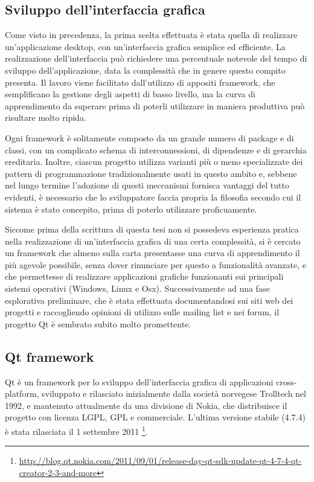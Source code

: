 \subsection{Sviluppo dell'interfaccia grafica}

Come visto in precedenza, la prima scelta effettuata è stata quella di realizzare un'applicazione desktop, con un'interfaccia grafica semplice ed efficiente. La realizzazione dell'interfaccia può richiedere una percentuale notevole del tempo di sviluppo dell'applicazione, data la complessità che in genere questo compito presenta. Il lavoro viene facilitato dall'utilizzo di appositi framework, che semplificano la gestione degli aspetti di basso livello, ma la curva di apprendimento da superare prima di poterli utilizzare in maniera produttiva può risultare molto ripida. 

Ogni framework è solitamente composto da un grande numero di package e di classi, con un complicato schema di interconnessioni, di dipendenze e di gerarchia ereditaria. Inoltre, ciascun progetto utilizza varianti più o meno specializzate dei pattern di programmazione tradizionalmente usati in questo ambito e, sebbene nel lungo termine l'adozione di questi meccanismi fornisca vantaggi del tutto evidenti, è necessario che lo sviluppatore faccia propria la filosofia secondo cui il sistema è stato concepito, prima di poterlo utilizzare proficuamente.

Siccome prima della scrittura di questa tesi non si possedeva esperienza pratica nella realizzazione di un'interfaccia grafica di una certa complessità, si è cercato un framework che almeno sulla carta presentasse una curva di apprendimento il più agevole possibile, senza dover rinunciare per questo a funzionalità avanzate, e che permettesse di realizzare applicazioni grafiche funzionanti sui principali sistemi operativi (Windows, Linux e Osx). 
Successivamente ad una fase esplorativa preliminare, che è stata effettuata documentandosi sui siti web dei progetti e raccogliendo opinioni di utilizzo sulle mailing list e nei forum, il progetto Qt è sembrato subito molto promettente. 

\subsection{Qt framework}

Qt è un framework per lo sviluppo dell'interfaccia grafica di applicazioni cross-platform, sviluppato e rilasciato inizialmente dalla società norvegese Trolltech nel 1992, e mantenuto attualmente da una divisione di Nokia, che distribuisce il progetto con licenza LGPL, GPL e commerciale. L'ultima versione stabile (4.7.4) è stata rilasciata il 1 settembre 2011 \footnote{\url{http://blog.qt.nokia.com/2011/09/01/release-day-qt-sdk-update-qt-4-7-4-qt-creator-2-3-and-more}}. 

